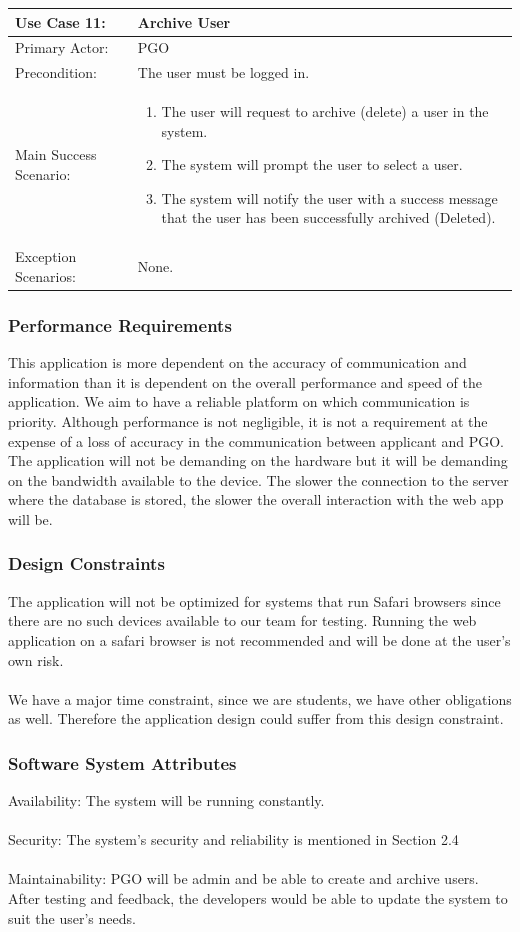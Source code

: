 \documentclass{article}
\begin{document}
\begin{tabular}{| m{5cm} | m{10cm} |}
\hline
Use Case 11: & Archive User \\
\hline
Primary Actor: & PGO \\
\hline
Precondition: & The user must be logged in. \\
\hline
Main Success Scenario: & \begin{enumerate} \itemsep0em \item The user will request to archive (delete) a user in the system. 
\item The system will prompt the user to select a user.
\item The system will notify the user with a success message that the user has been successfully archived (Deleted).
\end{enumerate} \\
\hline
Exception Scenarios: & None. \\
\hline
\end{tabular}
\subsubsection{Performance Requirements}
This application is more dependent on the accuracy of communication and information than it is dependent on the overall performance and speed of the application. We aim to have a reliable platform on which communication is priority. Although performance is not negligible, it is not a requirement at the expense of a loss of accuracy in the communication between applicant and PGO. The application will not be demanding on the hardware but it will be demanding on the bandwidth available to the device. The slower the connection to the server where the database is stored, the slower the overall interaction with the web app will be.
\subsubsection{Design Constraints}
The application will not be optimized for systems that run Safari browsers since there are no such devices available to our team for testing. Running the web application on a safari browser is not recommended and will be done at the user's own risk. \\ \\
We have a major time constraint, since we are students, we have other obligations as well. Therefore the application design could suffer from this design constraint.
\subsubsection{Software System Attributes}
Availability: The system will be running constantly.  \\ \\
Security: The system's security and reliability is mentioned in Section 2.4 \\ \\ 
Maintainability: PGO will be admin and be able to create and archive users. \\
After testing and feedback, the developers would be able to update the system to suit the user's needs.
\end{document}
